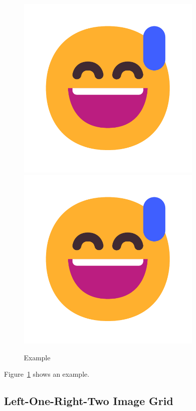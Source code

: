 \documentclass[letterpaper]{article}
\begin{document}
\begin{figure}
\begin{minipage}[b]{0.3\textwidth}
        \includegraphics[width=0.8\textwidth]{assets/example.pdf}
        \includegraphics[width=0.8\textwidth]{assets/example.pdf}
    \end{minipage}
    \caption{Example}
    \label{fig:grid}
\end{figure}

Figure~\ref{fig:grid} shows an example.



\subsection{Left-One-Right-Two Image Grid}
\end{document}
